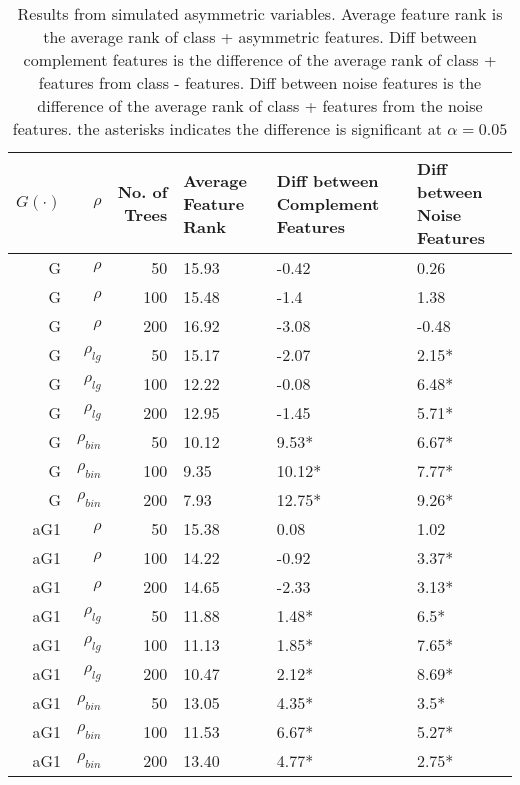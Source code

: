 \documentclass[twoside,11pt]{article}
\begin{document}
\begin{table}%
  \centering
  \caption{Results from simulated asymmetric variables. Average feature rank is the average rank of class + asymmetric features. Diff between complement features is the difference of the average rank of class + features from class - features. Diff between noise features is the difference of the average rank of class + features from the noise features. the asterisks indicates the difference is significant at $\alpha=0.05$ }
\begin{tabular}{rrrp{2.5cm}p{2.5cm}p{2.5cm}}
\hline
$G(\cdot)$ & $\rho$ & No. of Trees & Average Feature Rank & Diff between Complement Features & Diff between Noise Features \bigstrut\\
\hline
\renewcommand{\arraystretch}{.5}
G     & $\rho$ & 50    & 15.93 & -0.42 & 0.26 \bigstrut[t]\\
G     & $\rho$ & 100   & 15.48 & -1.4  & 1.38 \\
G     & $\rho$ & 200   & 16.92 & -3.08 & -0.48 \bigstrut[b]\\
\hline
G     & $\rho_{lg}$ & 50    & 15.17 & -2.07 & 2.15* \bigstrut[t]\\
G     & $\rho_{lg}$ & 100   & 12.22 & -0.08 & 6.48* \\
G     & $\rho_{lg}$ & 200   & 12.95 & -1.45 & 5.71* \bigstrut[b]\\
\hline
G     & $\rho_{bin}$ & 50    & 10.12 & 9.53* & 6.67* \bigstrut[t]\\
G     & $\rho_{bin}$ & 100   & 9.35  & 10.12* & 7.77* \\
G     & $\rho_{bin}$ & 200   & 7.93  & 12.75* & 9.26* \bigstrut[b]\\
\hline
aG1   & $\rho$ & 50    & 15.38 & 0.08  & 1.02 \bigstrut[t]\\
aG1   & $\rho$ & 100   & 14.22 & -0.92 & 3.37* \\
aG1   & $\rho$ & 200   & 14.65 & -2.33 & 3.13* \bigstrut[b]\\
\hline
aG1   & $\rho_{lg}$ & 50    & 11.88 & 1.48* & 6.5* \bigstrut[t]\\
aG1   & $\rho_{lg}$ & 100   & 11.13 & 1.85* & 7.65* \\
aG1   & $\rho_{lg}$ & 200   & 10.47 & 2.12* & 8.69* \bigstrut[b]\\
\hline
aG1   & $\rho_{bin}$ & 50    & 13.05 & 4.35* & 3.5* \bigstrut[t]\\
aG1   & $\rho_{bin}$ & 100   & 11.53 & 6.67* & 5.27* \\
aG1   & $\rho_{bin}$ & 200   & 13.40 & 4.77* & 2.75* \bigstrut[b]\\

\end{tabular}
\end{table}
\end{document}
